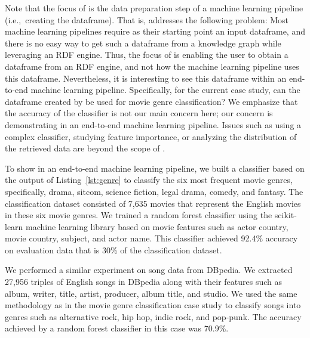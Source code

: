 Note that the focus of \rdfframes is the data preparation step of a machine learning pipeline
(i.e.,~creating the dataframe).
That is, \rdfframes addresses the following problem: Most machine learning pipelines require as their starting point an input dataframe,
and there is no easy way to get such a dataframe from a knowledge graph while leveraging an RDF engine.
Thus, the focus of \rdfframes is enabling the user to obtain a dataframe from an RDF engine, and not how the machine learning pipeline uses this dataframe.
Nevertheless, it is interesting to see this dataframe within an end-to-end  machine learning pipeline.
Specifically, for the current case study,
can the dataframe created by \rdfframes be used for movie genre classification?
We emphasize that the accuracy of the classifier is not our main concern here;
our concern is demonstrating \rdfframes in an end-to-end machine learning pipeline.
Issues such as using a complex classifier, studying feature importance, or analyzing the distribution of the retrieved data are beyond the scope of \rdfframes.

To show \rdfframes in an end-to-end machine learning pipeline,
we built a classifier based on the output of
Listing~\ref{lst:genre}
to classify the six most frequent movie genres,
specifically, drama, sitcom, science fiction, legal drama, comedy, and fantasy.
The classification dataset consisted of 7,635 movies that represent the English movies in these six movie genres.
We trained a random forest classifier using the scikit-learn machine learning library based on movie features such as actor country, movie country, subject, and actor name.
This classifier achieved 92.4\% accuracy on evaluation data that is 30\% of the classification dataset.

We performed a similar experiment on song data from DBpedia. 
We extracted 27,956 triples of English songs in DBpedia along with their features such as album, writer, title, artist, producer, album title, and studio. 
We used the same methodology as in the movie genre classification case study to classify songs into genres such as alternative rock, hip hop, indie rock, and pop-punk.
The accuracy achieved by a random forest classifier in this case was 70.9\%.


